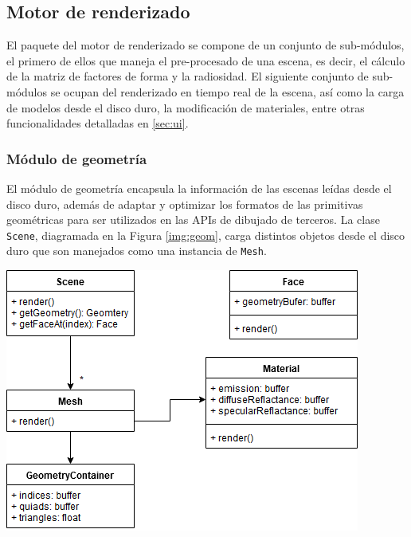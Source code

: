 \subsection{Motor de renderizado}
\label{sec:engine}

El paquete del motor de renderizado se compone de un conjunto de sub-módulos, el primero de ellos que maneja el pre-procesado de una escena, es decir, el cálculo de la matriz de factores de forma y la radiosidad. El siguiente conjunto de sub-módulos se ocupan del renderizado en tiempo real de la escena, así como la carga de modelos desde el disco duro, la modificación de materiales, entre otras funcionalidades detalladas en \ref{sec:ui}.

\subsubsection{Módulo de geometría}

El módulo de geometría encapsula la información de las escenas leídas desde el disco duro, además de adaptar y optimizar los formatos de las primitivas geométricas para ser utilizados en las APIs de dibujado de terceros. La clase \verb|Scene|, diagramada en la Figura \ref{img:geom}, carga distintos objetos desde el disco duro que son manejados como una instancia de \verb|Mesh|.


\vspace{5mm}
\begin{minipage}[h]{0.7\linewidth}
	\centering
	\includegraphics[width=\linewidth]{assets/geometry}
	\label{img:geom}
\end{minipage}

